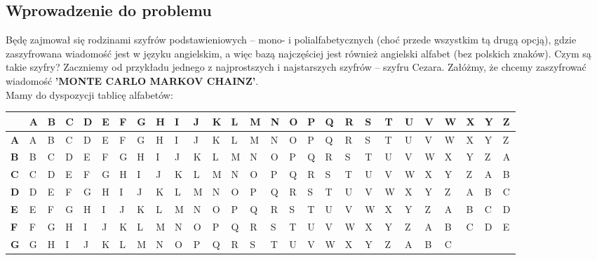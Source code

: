 \documentclass[a4paper]{article}
\theoremstyle{defn}
\theoremstyle{theorem}
\theoremstyle{lemma}
\theoremstyle{cor}
\theoremstyle{fact}
\begin{document}
\subsection{Wprowadzenie do problemu}
Będę zajmował się rodzinami szyfrów podstawieniowych – mono- i polialfabetycznych (choć przede wszystkim tą drugą opcją), gdzie zaszyfrowana wiadomość jest w języku angielskim, a więc bazą najczęściej jest również angielski alfabet (bez polskich znaków). Czym są takie szyfry? Zaczniemy od przykładu jednego z najprostszych i najstarszych szyfrów – szyfru Cezara. Załóżmy, że chcemy zaszyfrować wiadomość \textbf{'MONTE CARLO MARKOV CHAINZ'}.\\
Mamy do dyspozycji tablicę alfabetów:\\
\begin{center}
\begin{longtable}
{|p{1.5mm}|p{1.5mm}|p{1.5mm}|p{1.5mm}|p{1.5mm}|p{1.5mm}|p{1.5mm}|p{1.5mm}|p{1.5mm}|p{1.5mm}|p{1.5mm}|p{1.5mm}|p{1.5mm}|p{1.5mm}|p{1.5mm}|p{1.5mm}|p{1.5mm}|p{1.5mm}|p{1.5mm}|p{1.5mm}|p{1.5mm}|p{1.5mm}|p{1.5mm}|p{1.5mm}|p{1.5mm}|p{1.5mm}|p{1.5mm}|}
\hline
 & \textbf{A} & \textbf{B} & \textbf{C} & \textbf{D} & \textbf{E} & \textbf{F} & \textbf{G} & \textbf{H} & \textbf{I} & \textbf{J} & \textbf{K} & \textbf{L} & \textbf{M} & \textbf{N} & \textbf{O} & \textbf{P} & \textbf{Q} & \textbf{R} & \textbf{S} & \textbf{T} & \textbf{U} & \textbf{V} &
\textbf{W} & \textbf{X} & \textbf{Y} & \textbf{Z} \\
\hline
\textbf{A} & A & B & C & D & E & F & G & H & I & J & K & L & M & N & O & P & Q & R & S & T & U & V &
W & X & Y & Z
\\
\hline
\textbf{B} & B & C & D & E & F & G & H & I & J & K & L & M & N & O & P & Q & R & S & T & U & V & W & X
 & Y & Z & A
\\
\hline
\textbf{C} & C & D & E & F & G & H & I & J & K & L & M & N & O & P & Q & R & S & T & U & V & W & X & Y
 & Z & A & B
\\
\hline
\textbf{D} & D & E & F & G & H & I & J & K & L & M & N & O & P & Q & R & S & T & U & V & W & X & Y & Z
 & A & B & C
\\
\hline
\textbf{E} & E & F & G & H & I & J & K & L & M & N & O & P & Q & R & S & T & U & V & W & X & Y & Z & A
 & B & C & D
\\
\hline
\textbf{F} & F & G & H & I & J & K & L & M & N & O & P & Q & R & S & T & U & V & W & X & Y & Z & A & B
 & C & D & E
\\
\hline
\textbf{G} & G & H & I & J & K & L & M & N & O & P & Q & R & S & T & U & V & W & X & Y & Z & A & B & C

\end{longtable}
\end{center}
\end{document}

